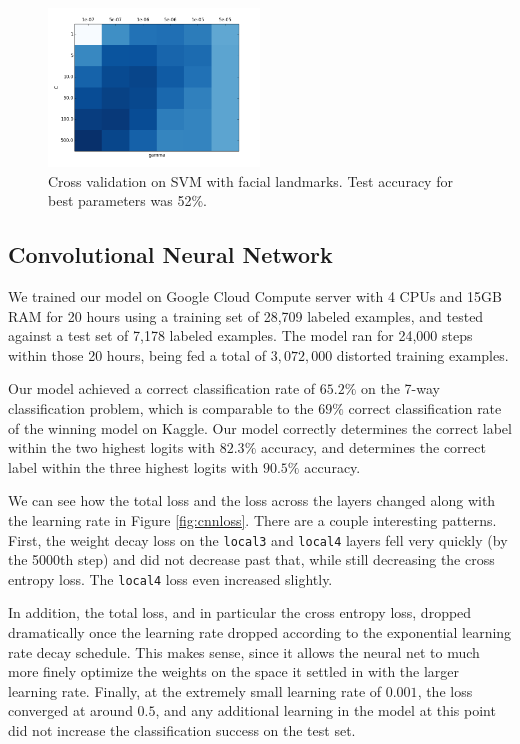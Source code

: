 \documentclass[11pt, twocolumn, twoside]{article}
\begin{document}
\begin{figure}
\centering
\includegraphics[width=0.5\textwidth]{grid_search_landmarks}
\caption{\label{fig:grid_pca} Cross validation on SVM with facial landmarks. Test accuracy for best
parameters was 52\%.}
\end{figure}


\subsection{Convolutional Neural Network}

We trained our model on Google Cloud Compute server with 4 CPUs and 15GB RAM for 20 hours using a training set of 28,709 labeled examples, and tested against a test set of 7,178 labeled examples. The model ran for 24,000 steps within those 20 hours, being fed a total of $3,072,000$ distorted training examples.

Our model achieved a correct classification rate of $65.2\%$ on the 7-way classification problem, which is comparable to the $69\%$ correct classification rate of the winning model on Kaggle. Our model correctly determines the correct label within the two highest logits with $82.3\%$ accuracy, and determines the correct label within the three highest logits with $90.5\%$ accuracy.

We can see how the total loss and the loss across the layers changed along with the learning rate in Figure \ref{fig:cnnloss}. There are a couple interesting patterns. First, the weight decay loss on the \texttt{local3} and \texttt{local4} layers fell very quickly (by the 5000th step) and did not decrease past that, while still decreasing the cross entropy loss. The \texttt{local4} loss even increased slightly. 

In addition, the total loss, and in particular the cross entropy loss, dropped dramatically once the learning rate dropped according to the exponential learning rate decay schedule. This makes sense, since it allows the neural net to much more finely optimize the weights on the space it settled in with the larger learning rate. Finally, at the extremely small learning rate of $0.001$, the loss converged at around $0.5$, and any additional learning in the model at this point did not increase the classification success on the test set.
\end{document}
